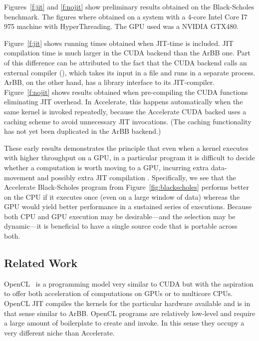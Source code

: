 Figures~\ref{f:jit} and \ref{f:nojit} show preliminary results obtained on 
the Black-Scholes benchmark. The figures where obtained on a system with a 4-core 
Intel Core I7 975 machine with HyperThreading. The GPU used was a NVIDIA GTX480.

Figure~\ref{f:jit} shows running times obtained when JIT-time is included. 
JIT compilation time is much larger 
in the CUDA backend than the ArBB one.  Part of this difference 
can be attributed to the fact that 
the CUDA backend calls an external compiler (), which takes its input in a file and runs in
a separate process.  ArBB, on the other hand, has a library interface to its  JIT-compiler. 
Figure~\ref{f:nojit} shows results obtained when pre-compiling the
CUDA functions eliminating JIT overhead.
In Accelerate, this happens automatically when the same kernel is
invoked repeatedly, because the Accelerate CUDA backed 
uses a caching scheme to avoid unnecessary JIT invocations.  (The
caching functionality has not yet been duplicated in the 
ArBB backend.)

These early results demonstrates the principle that even when a kernel
executes with higher throughput on a GPU, in a particular program it
is difficult to decide whether a computation is worth moving to a GPU,
incurring extra data-movement and possibly extra JIT compilation
\cite{wheres-the-data-paper}.  Specifically, we see that the
Accelerate Black-Scholes program from Figure~\ref{fig:blackscholes}
performs better on the CPU if it executes once (even on a large window
of data) whereas the GPU would yield better performance in a sustained
series of executions.
%
Because both CPU and GPU execution may be desirable---and the
selection may be dynamic---it is beneficial to have a single source code
that is portable across both.  


\subsection{Related Work}


OpenCL~\cite{opencl08} is a programming model very similar to CUDA but with the aspiration 
to offer both acceleration of computations on GPUs or to multicore CPUs. 
OpenCL JIT compiles the kernels for the particular hardware available and is
in that sense similar to ArBB.  
OpenCL programs are relatively low-level and require a large amount of
boilerplate to create and invoke.  In this sense they occupy a very
different niche than Accelerate.


